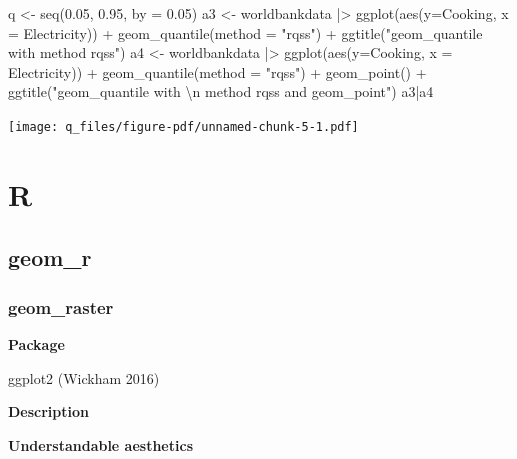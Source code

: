 \documentclass[
  letterpaper,
  DIV=11,
  numbers=noendperiod]{scrreprt}
\newenvironment{Shaded}{\begin{snugshade}}{\end{snugshade}}
\newcommand{\AttributeTok}[1]{\textcolor[rgb]{0.40,0.45,0.13}{#1}}
\newcommand{\FloatTok}[1]{\textcolor[rgb]{0.68,0.00,0.00}{#1}}
\newcommand{\FunctionTok}[1]{\textcolor[rgb]{0.28,0.35,0.67}{#1}}
\newcommand{\NormalTok}[1]{\textcolor[rgb]{0.00,0.23,0.31}{#1}}
\newcommand{\OtherTok}[1]{\textcolor[rgb]{0.00,0.23,0.31}{#1}}
\newcommand{\SpecialCharTok}[1]{\textcolor[rgb]{0.37,0.37,0.37}{#1}}
\newcommand{\StringTok}[1]{\textcolor[rgb]{0.13,0.47,0.30}{#1}}
\begin{document}
\begin{Shaded}
\begin{Highlighting}[]
\NormalTok{q }\OtherTok{\textless{}{-}} \FunctionTok{seq}\NormalTok{(}\FloatTok{0.05}\NormalTok{, }\FloatTok{0.95}\NormalTok{, }\AttributeTok{by =} \FloatTok{0.05}\NormalTok{)}
\NormalTok{a3 }\OtherTok{\textless{}{-}}\NormalTok{ worldbankdata }\SpecialCharTok{|\textgreater{}}
  \FunctionTok{ggplot}\NormalTok{(}\FunctionTok{aes}\NormalTok{(}\AttributeTok{y=}\NormalTok{Cooking, }\AttributeTok{x =}\NormalTok{ Electricity)) }\SpecialCharTok{+} 
  \FunctionTok{geom\_quantile}\NormalTok{(}\AttributeTok{method =} \StringTok{"rqss"}\NormalTok{) }\SpecialCharTok{+} 
  \FunctionTok{ggtitle}\NormalTok{(}\StringTok{"geom\_quantile with method rqss"}\NormalTok{)}
\NormalTok{a4 }\OtherTok{\textless{}{-}}\NormalTok{ worldbankdata }\SpecialCharTok{|\textgreater{}}
  \FunctionTok{ggplot}\NormalTok{(}\FunctionTok{aes}\NormalTok{(}\AttributeTok{y=}\NormalTok{Cooking, }\AttributeTok{x =}\NormalTok{ Electricity)) }\SpecialCharTok{+} 
  \FunctionTok{geom\_quantile}\NormalTok{(}\AttributeTok{method =} \StringTok{"rqss"}\NormalTok{) }\SpecialCharTok{+} 
  \FunctionTok{geom\_point}\NormalTok{() }\SpecialCharTok{+}
  \FunctionTok{ggtitle}\NormalTok{(}\StringTok{"geom\_quantile with }\SpecialCharTok{\textbackslash{}n}\StringTok{ method rqss and geom\_point"}\NormalTok{)}
\NormalTok{a3}\SpecialCharTok{|}\NormalTok{a4}
\end{Highlighting}
\end{Shaded}

\texttt{[image: q\_files/figure-pdf/unnamed-chunk-5-1.pdf]}

\part{R}

\chapter{geom\_r}\label{sec-r}

\section{geom\_raster}\label{raster}

\textbf{Package}

ggplot2 (Wickham 2016)

\textbf{Description}

\textbf{Understandable aesthetics}
\end{document}
